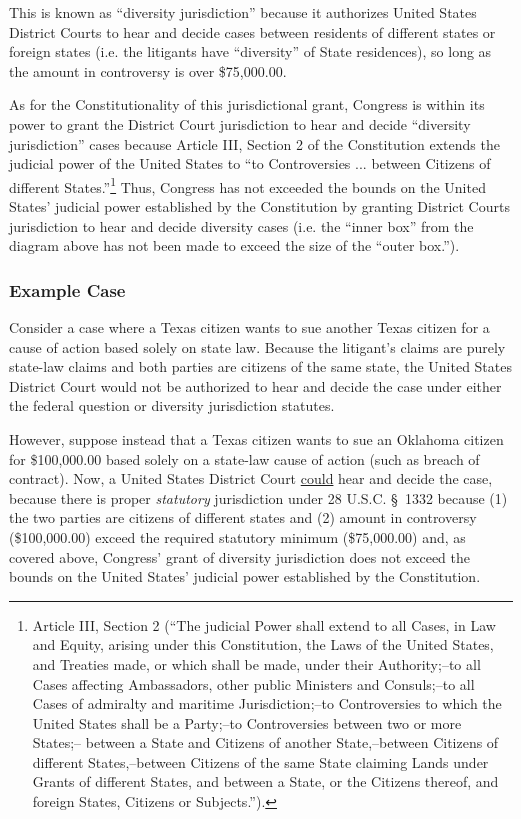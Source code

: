 This is known as ``diversity jurisdiction'' because it authorizes United States District Courts to hear and decide cases between residents of different states or foreign states (i.e. the litigants have ``diversity'' of State residences), so long as the amount in controversy is over \$75,000.00.

As for the Constitutionality of this jurisdictional grant, Congress is within its power to grant the District Court jurisdiction to hear and decide ``diversity jurisdiction'' cases because Article III, Section 2 of the Constitution extends the judicial power of the United States to ``to Controversies ... between Citizens of different States.''\footnote{Article III, Section 2 (``The judicial Power shall extend to all Cases, in Law and Equity, arising under this Constitution, the Laws of the United States, and Treaties made, or which shall be made, under their Authority;--to all Cases affecting Ambassadors, other public Ministers and Consuls;--to all Cases of admiralty and maritime Jurisdiction;--to Controversies to which the United States shall be a Party;--to Controversies between two or more States;-- between a State and Citizens of another State,--between Citizens of different States,--between Citizens of the same State claiming Lands under Grants of different States, and between a State, or the Citizens thereof, and foreign States, Citizens or Subjects.'').}  Thus, Congress has not exceeded the bounds on the United States' judicial power established by the Constitution by granting District Courts jurisdiction to hear and decide diversity cases (i.e. the ``inner box'' from the diagram above has not been made to exceed the size of the ``outer box.'').


\subsubsection{Example Case}

Consider a case where a Texas citizen wants to sue another Texas citizen for a cause of action based solely on state law.  Because the litigant's claims are purely state-law claims and both parties are citizens of the same state, the United States District Court would not be authorized to hear and decide the case under either the federal question or diversity jurisdiction statutes.

However, suppose instead that a Texas citizen wants to sue an Oklahoma citizen for \$100,000.00 based solely on a state-law cause of action (such as breach of contract).  Now, a United States District Court \underline{could} hear and decide the case, because there is proper \textit{statutory} jurisdiction under 28 U.S.C. \S\ 1332 because (1) the two parties are citizens of different states and (2) amount in controversy (\$100,000.00) exceed the required statutory minimum (\$75,000.00) and, as covered above, Congress' grant of diversity jurisdiction does not exceed the bounds on the United States' judicial power established by the Constitution.


